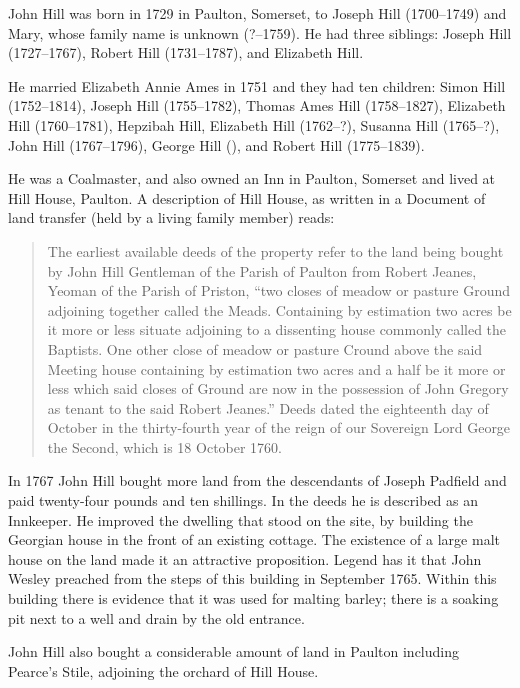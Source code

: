 
John Hill was born in 1729 in Paulton, Somerset, to Joseph Hill (1700--1749) and Mary, whose family name is unknown (?--1759). He had three siblings: Joseph Hill (1727--1767), Robert Hill (1731--1787), and Elizabeth Hill.

He married Elizabeth Annie Ames in 1751 and they had ten children: Simon Hill (1752--1814), Joseph Hill (1755--1782),
Thomas Ames Hill (1758--1827), Elizabeth Hill (1760--1781), Hepzibah Hill, Elizabeth Hill (1762--?), Susanna Hill (1765--?), John Hill (1767--1796), George Hill (), and Robert Hill (1775--1839).

He was a Coalmaster, and also owned an Inn in Paulton, Somerset and lived at Hill House, Paulton. A description of  Hill House, as written in a Document of land transfer (held by a living family member) reads:\cite{TheHistoryOfHillHouse}

\begin{quotation}
The earliest available deeds of the property refer to the land being bought by John Hill Gentleman of the Parish of Paulton from Robert Jeanes, Yeoman of the Parish of Priston, ``two closes of meadow or pasture Ground adjoining together called the Meads. Containing by estimation two acres be it more or less situate adjoining to a dissenting house commonly called the Baptists. One other close of meadow or pasture Cround above the said Meeting house containing by estimation two acres and a half be it more or less which said closes of Ground are now in the possession of John Gregory as tenant to the said Robert Jeanes.'' Deeds dated the eighteenth day of October in the thirty-fourth year of the reign of our Sovereign Lord George the Second, which is 18 October 1760.
\end{quotation}

In 1767 John Hill bought more land from the descendants of Joseph Padfield and paid twenty-four pounds and ten shillings. In the deeds he is described as an Innkeeper. He improved the dwelling that stood on the site, by building the Georgian house in the front of an existing cottage. The existence of a large malt house on the land made it an attractive proposition. Legend has it that John Wesley preached from the steps of this building in September 1765. Within this building there is evidence that it was used for malting barley; there is a soaking pit next to a well and drain by the old entrance.

John Hill also bought a considerable amount of land in Paulton including Pearce's Stile, adjoining the orchard of Hill House.

